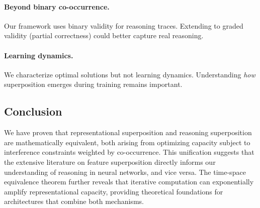 \paragraph{Beyond binary co-occurrence.} Our framework uses binary validity for reasoning traces. Extending to graded validity (partial correctness) could better capture real reasoning.

\paragraph{Learning dynamics.} We characterize optimal solutions but not learning dynamics. Understanding \emph{how} superposition emerges during training \citep{zhu2025emergence} remains important.

\subsection{Conclusion}

We have proven that representational superposition and reasoning superposition are mathematically equivalent, both arising from optimizing capacity subject to interference constraints weighted by co-occurrence. This unification suggests that the extensive literature on feature superposition directly informs our understanding of reasoning in neural networks, and vice versa. The time-space equivalence theorem further reveals that iterative computation can exponentially amplify representational capacity, providing theoretical foundations for architectures that combine both mechanisms.
